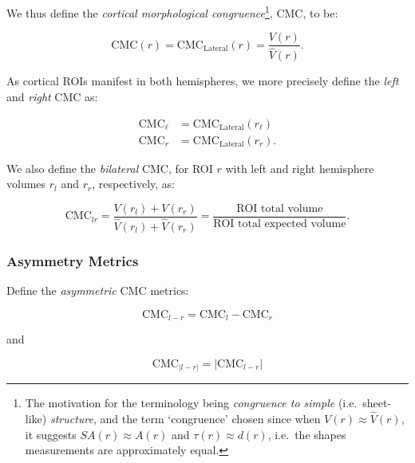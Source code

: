 \documentclass{article}
\begin{document}
We thus define the \emph{cortical morphological congruence}\footnote{The
motivation for the terminology being \emph{congruence to simple} (i.e.\
sheet-like) \emph{structure}, and the term `congruence' chosen since when
\(V(r) \approx \hat{V}(r)\), it suggests \(SA(r) \approx A(r)\) and \(\tau(r)
\approx d(r)\), i.e.\ the shapes measurements are approximately equal.}, CMC,
to be:

\begin{equation}
\text{CMC}(r) = \text{CMC}_{\text{Lateral}}(r) = \frac{V(r)}{\hat{V}(r)}.
\end{equation}

As cortical ROIs manifest in both hemispheres, we more precisely define the \emph{left}
and \emph{right} CMC as:

\begin{align}
\label{eq:cmc-laterals}
\text{CMC}_{\ell} &= \text{CMC}_{\text{Lateral}}(r_{\ell}) \\
\text{CMC}_r &= \text{CMC}_{\text{Lateral}}(r_r).
\end{align}

We also define the \emph{bilateral} CMC, for ROI \(r\) with left and right
hemisphere volumes \(r_l\) and \(r_r\), respectively, as:

\begin{equation} \label{eq:cmc-bilateral}
\text{CMC}_{lr}
=\frac{V(r_l) + V(r_r)}{\hat{V}(r_l) + \hat{V}(r_r)}
=\frac{\text{ROI total volume}}{\text{ROI total expected volume}}.
\end{equation}



\subsubsection{Asymmetry Metrics}

Define the \emph{asymmetric} CMC metrics:

%

\begin{equation} \label{eq:asym-signed-diff}
\text{CMC}_{l - r} = \text{CMC}_{l} - \text{CMC}_{r}
\end{equation}

and

\begin{equation} \label{eq:asym-unsigned-diff}
\text{CMC}_{|l - r|} = \lvert\text{CMC}_{l - r} \rvert
\end{equation}
\end{document}
